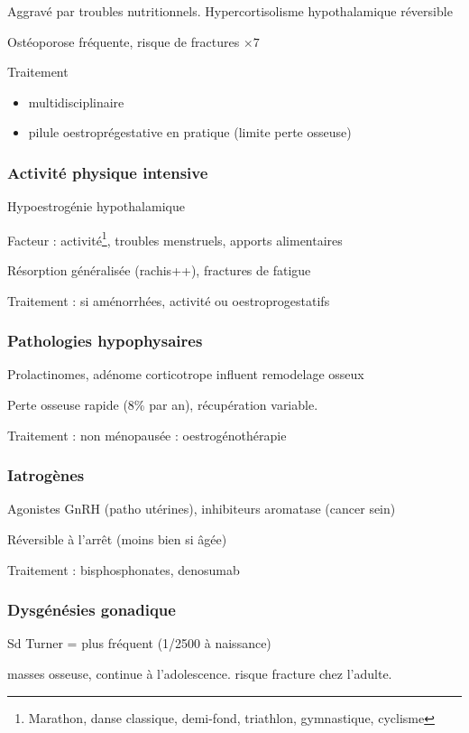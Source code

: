 \documentclass[11pt]{article}
\begin{document}
Aggravé par troubles nutritionnels. Hypercortisolisme hypothalamique réversible

Ostéoporose fréquente, risque de fractures \(\times 7\)

Traitement 
\begin{itemize}
\item multidisciplinaire
\item pilule oestroprégestative en pratique (limite perte osseuse)
\end{itemize}

\subsubsection{Activité physique intensive}
\label{sec:org95badf0}
Hypoestrogénie hypothalamique

Facteur : activité\footnote{Marathon, danse classique, demi-fond, triathlon, gymnastique, cyclisme}, troubles menstruels, apports alimentaires

Résorption généralisée (rachis++), \inc fractures de fatigue

Traitement : si aménorrhées, \dec activité ou oestroprogestatifs

\subsubsection{Pathologies hypophysaires}
\label{sec:orgfded37d}
Prolactinomes, adénome corticotrope influent remodelage osseux

Perte osseuse rapide (8\% par an), récupération variable.

Traitement : \female{} non ménopausée : oestrogénothérapie

\subsubsection{Iatrogènes}
\label{sec:orgdbe85c8}
Agonistes GnRH (patho utérines), inhibiteurs aromatase (cancer sein)

Réversible à l'arrêt (moins bien si âgée)

Traitement : bisphosphonates, denosumab

\subsubsection{Dysgénésies gonadique}
\label{sec:org3036516}
Sd Turner = plus fréquent (1/2500 à naissance)

\dec masses osseuse, continue à l'adolescence. \inc risque fracture chez
l'adulte.
\end{document}
